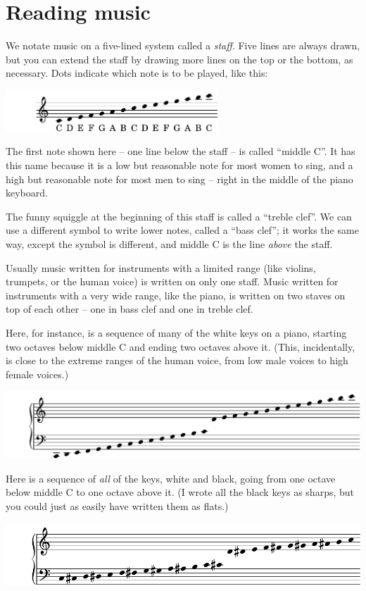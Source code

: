 \documentclass[10pt]{article}
\begin{document}
\section {Reading music}

We notate music on a five-lined system called a {\it staff}. Five lines are always drawn, but you can extend 
the staff by drawing more lines on the top or the bottom, as necessary. Dots indicate which note is to be played,
like this:

\begin{center}\includegraphics[width=0.6\textwidth]{staff1-crop.pdf}\end{center}

The first note shown here -- one line below the staff -- is called ``middle C''. It has this name because it is a
low but reasonable note for most women to sing, and a high but reasonable note for most men to sing -- right in the 
middle of the piano keyboard.

The funny squiggle at the beginning of this staff is called a ``treble clef''. We can use a different symbol to write
lower notes, called a ``bass clef''; it works the same way, except the symbol is different, and middle C is the line
{\it above} the staff.

Usually music written for instruments with a limited range (like violins, trumpets, or the human voice)
is written on only one staff. Music written for instruments with a very wide range, like the piano, is 
written on two staves on top of each other -- one in bass clef and one in treble clef.

Here, for instance, is a sequence of many of the white keys on a piano, starting two octaves below middle C
and ending two octaves above it. (This, incidentally, is close to the extreme ranges of the human voice, from
low male voices to high female voices.)

\begin{center}\includegraphics[width=\textwidth]{staff2-crop.pdf}\end{center}

Here is a sequence of {\it all} of the keys, white and black, going from one octave below middle C to one 
octave above it. (I wrote all the black keys as sharps, but you could just as easily have written them as flats.)

\begin{center}\includegraphics[width=\textwidth]{staff3-crop.pdf}\end{center}
\end{document}
